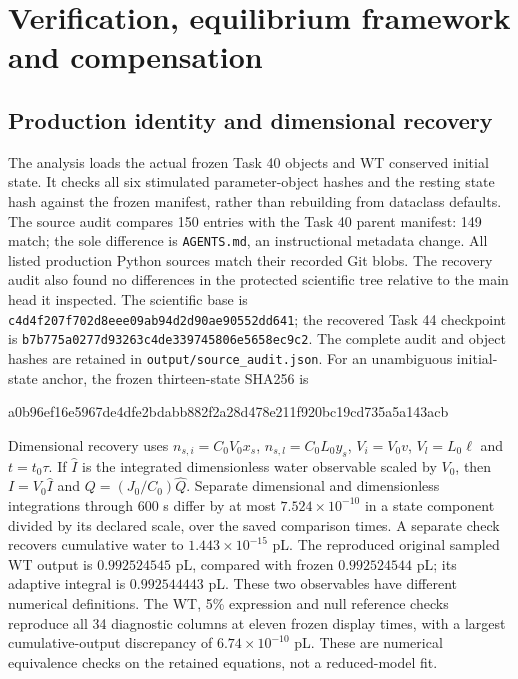 \section{Verification, equilibrium framework and compensation}
\label{sec:integrated-context}

\subsection{Production identity and dimensional recovery}
The analysis loads the actual frozen Task 40 objects and WT conserved initial
state. It checks all six stimulated parameter-object hashes and the resting
state hash against the frozen manifest, rather than rebuilding from dataclass
defaults. The source audit compares 150 entries with the Task 40 parent
manifest: 149 match; the sole difference is \texttt{AGENTS.md}, an instructional
metadata change. All listed production Python sources match their recorded
Git blobs. The recovery audit also found no differences in the protected
scientific tree relative to the main head it inspected. The scientific base
is \texttt{c4d4f207f702d8eee09ab94d2d90ae90552dd641}; the recovered Task 44
checkpoint is \texttt{b7b775a0277d93263c4de339745806e5658ec9c2}.
The complete audit and object hashes are retained in
\texttt{output/source\_audit.json}. For an unambiguous initial-state anchor,
the frozen thirteen-state SHA256 is
\begin{center}\footnotesize\ttfamily
a0b96ef16e5967de4dfe2bdabb882f2a28d478e211f920bc19cd735a5a143acb
\end{center}

Dimensional recovery uses $n_{s,i}=C_0V_0x_s$,
$n_{s,l}=C_0L_0y_s$, $V_i=V_0v$, $V_l=L_0\ell$ and $t=t_0\tau$.
If $\widehat I$ is the integrated dimensionless water observable scaled by
$V_0$, then $I=V_0\widehat I$ and $Q=(J_0/C_0)\widehat Q$.
Separate dimensional and dimensionless integrations through 600 s differ by
at most $7.524\times10^{-10}$ in a state component divided by its declared
scale, over the saved comparison times. A separate check recovers cumulative
water to $1.443\times10^{-15}$ pL. The reproduced original sampled WT output
is $0.992524545$ pL, compared with frozen $0.992524544$ pL; its adaptive
integral is $0.992544443$ pL. These two observables have different numerical
definitions. The WT, 5\% expression and null reference checks reproduce
all 34 diagnostic columns at eleven frozen display times, with a largest
cumulative-output discrepancy of $6.74\times10^{-10}$ pL. These are numerical
equivalence checks on the retained equations, not a reduced-model fit.

